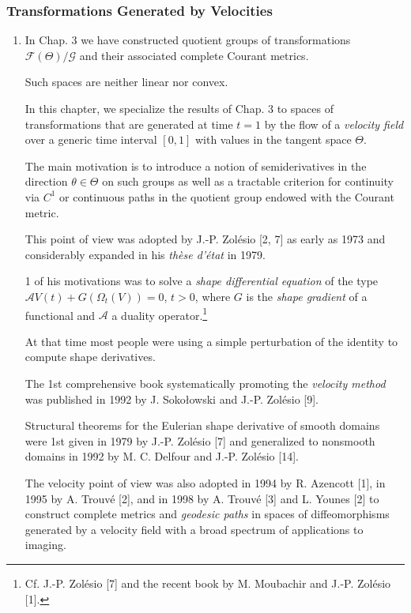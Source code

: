 \documentclass{book}
\numberwithin{equation}{section}
\begin{document}
\subsubsection{Transformations Generated by Velocities}
\begin{enumerate}
    \item In Chap. 3 we have constructed quotient groups of transformations $\mathcal{F}(\Theta)/\mathcal{G}$ and their associated complete Courant metrics.
    
    Such spaces are neither linear nor convex.
    
    In this chapter, we specialize the results of Chap. 3 to spaces of transformations that are generated at time $t = 1$ by the flow of a \textit{velocity field} over a generic time interval $[0,1]$ with values in the tangent space $\Theta$.
    
    The main motivation is to introduce a notion of semiderivatives in the direction $\theta\in\Theta$ on such groups as well as a tractable criterion for 
    continuity via $C^1$ or continuous paths in the quotient group endowed with the Courant metric.
    
    This point of view was adopted by J.-P. Zolésio [2, 7] as early as 1973 and considerably expanded in his \textit{thèse d'état} in 1979.
    
    1 of his motivations was to solve a \textit{shape differential equation} of the type $\mathcal{A}V(t) + G(\Omega_t(V)) = 0$, $t > 0$, where $G$ is the \textit{shape gradient} of a functional and $\mathcal{A}$ a duality operator.\footnote{Cf. J.-P. Zolésio [7] and the recent book by M. Moubachir and J.-P. Zolésio [1].}
    
    At that time most people were using a simple perturbation of the identity to compute shape derivatives.
    
    The 1st comprehensive book systematically promoting the \textit{velocity method} was published in 1992 by J. Soko\l owski and J.-P. Zolésio [9].
    
    Structural theorems for the Eulerian shape derivative of smooth domains were 1st given in 1979 by J.-P. Zolésio [7] and generalized to nonsmooth domains in 1992 by M. C. Delfour and J.-P. Zolésio [14].
    
    The velocity point of view was also adopted in 1994 by R. Azencott [1], in 1995 by A. Trouvé [2], and in 1998 by A. Trouvé [3] and L. Younes [2] to construct complete metrics and \textit{geodesic paths} in spaces of diffeomorphisms generated by a velocity field with a broad spectrum of applications to imaging.
    

\end{enumerate}
\end{document}
